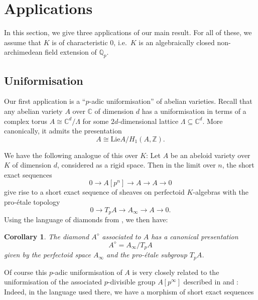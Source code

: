 \documentclass[10pt,oneside]{amsart}
\newtheorem{corollary}[theorem]{Corollary}
\theoremstyle{definition}
\newcommand{\Z}{\mathbb{Z}}
\newcommand{\Q}{\mathbb{Q}}
\begin{document}
	
 
	\section{Applications}
	In this section, we give three applications of our main result. For all of these, we assume that $K$ is of characteristic $0$, i.e.\ $K$ is an algebraically closed non-archimedean field extension of $\Q_p$.
	\subsection{Uniformisation}
	Our first application is a ``$p$-adic uniformisation'' of abelian varieties.
	Recall that any abelian variety $A$ over $\mathbb C$ of dimension $d$ has a uniformisation in terms of a complex torus $A\cong \mathbb C^d/\Lambda$ for some $2d$-dimensional lattice $\Lambda\subseteq \mathbb C^d$. More canonically, it admits the presentation
\[
 A\cong \mathrm{Lie} A/H_1(A,\Z).
\]
	
	We have the following analogue of this over $K$: Let $A$ be an abeloid variety over $K$ of dimension $d$, considered as a rigid space. Then in the limit over $n$, the short exact sequences
	\[ 0\to A[p^n]\to A\to A\to 0\]
	give rise to a short exact sequence of sheaves on perfectoid $K$-algebras with the pro-\'etale topology
	\[0\to T_pA \to A_\infty \to A\to 0.\]
	Using the language of diamonds from \cite{etale_cohomology_of_diamonds}, we then have:
	\begin{corollary}
		The diamond $A^{\diamond}$ associated to $A$ has a canonical presentation
		\[A^{\diamond} = A_\infty/T_pA \]
		given by the perfectoid space $A_\infty$ and the pro-\'etale subgroup $T_pA$.
	\end{corollary}
	Of course this $p$-adic uniformisation of $A$ is very closely related to the uniformisation of the associated $p$-divisible group $A[p^\infty]$ described in \cite{SW} and \cite[\S4]{survey}: Indeed, in the language used there, we have a morphism of short exact sequences
	
	\begin{center}
	\end{center}
\end{document}
